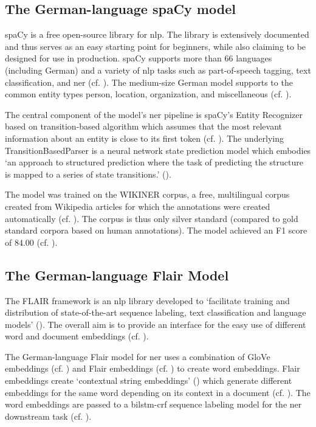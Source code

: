 \subsection{The German-language spaCy model}
spaCy is a free open-source library for \gls{nlp}. The library is extensively documented and thus serves as an easy starting point for beginners, while also claiming to be designed for use in production.
spaCy supports more than 66 languages (including German) and a variety of \gls{nlp} tasks such as part-of-speech tagging, text classification, and \gls{ner} (cf. \cite{spacy_facts}). 
The medium-size German model supports to the common entity types person, location, organization, and miscellaneous (cf. \cite{spacy_german_md}). 

The central component of the model's \gls{ner} pipeline is spaCy's Entity Recognizer based on transition-based algorithm which assumes that the most relevant information about an entity is close to its first token (cf. \cite{spacy_entity_recognizer}). The underlying TransitionBasedParser is a neural network state prediction model which embodies `an approach to structured prediction where the task of predicting the structure is mapped to a series of state transitions.' (\cite{spacy_transition_based_parser}). 

The model was trained on the WIKINER corpus, a free, multilingual corpus created from Wikipedia articles for which the annotations were created automatically (cf. \cite{nothman_learning_2013}). The corpus is thus only silver standard (compared to gold standard corpora based on human annotations). The model achieved an F1 score of 84.00 (cf. \cite{spacy_german_md}).

\subsection{The German-language Flair Model}
\label{sec:flair_de}
The FLAIR framework is an \gls{nlp} library developed to `facilitate training and distribution of
state-of-the-art sequence labeling, text classification and language models' (\cite{akbik2019flair}). The overall aim is to provide an interface for the easy use of different word and document embeddings (cf. \cite{akbik2019flair}).

The German-language Flair model for \gls{ner} uses a combination of GloVe embeddings (cf. \cite{pennington2014glove}) and Flair embeddings (cf. \cite{akbik2018coling}) to create word embeddings. Flair embeddings create `contextual string embeddings' (\cite{akbik2018coling}) which generate different embeddings for the same word depending on its context in a document (cf. \cite{akbik2018coling}).
The word embeddings are passed to a \gls{bilstm}-\gls{crf} sequence labeling model for the \gls{ner} downstream task (cf. \cite{akbik2018coling}). 

